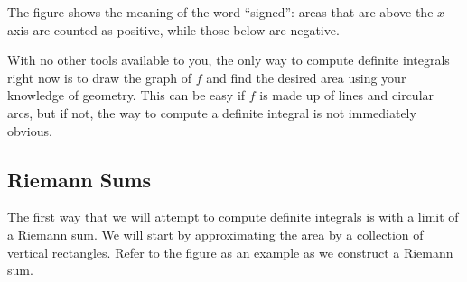 The figure shows the meaning of the word ``signed'': areas that are above the $x$-axis are counted as positive, while those below are negative.

With no other tools available to you, the only way to compute definite integrals right now is to draw the graph of $f$ and find the desired area using your knowledge of geometry.  This can be easy if $f$ is made up of lines and circular arcs, but if not, the way to compute a definite integral is not immediately obvious.

\subsection{Riemann Sums}

The first way that we will attempt to compute definite integrals is with a limit of a Riemann sum. We will start by approximating the area by a collection of vertical rectangles. Refer to the figure as an example as we construct a Riemann sum.

